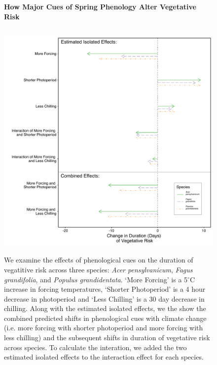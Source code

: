 \documentclass{article}\usepackage[]{graphicx}\usepackage[]{color}
\begin{document}
\begin{figure} [H] 
 \begin{center}
 \textbf{How Major Cues of Spring Phenology Alter Vegetative Risk}\par\medskip
 \includegraphics[width=12cm, height=12cm]{..//figure/Exp_plotTPS.pdf} 
 \caption{We examine the effects of phenological cues on the duration of vegatitive risk across three species: \textit{Acer pensylvanicum}, \textit{Fagus grandifolia}, and \textit{Populus grandidentata}. `More Forcing' is a 5$^{\circ}$C increase in forcing temperatures, `Shorter Photoperiod' is a 4 hour decrease in photoperiod and `Less Chilling' is a 30 day decrease in chilling. Along with the estimated isolated effects, we the show the combined predicted shifts in phenological cues with climate change (i.e. more forcing with shorter photoperiod and more forcing with less chilling) and the subsequent shifts in duration of vegetative risk across species. To calculate the interation, we added the two estimated isolated effects to the interaction effect for each species.   }\label{fig:dan} 
 \end{center}
 \end{figure}
\end{document}
